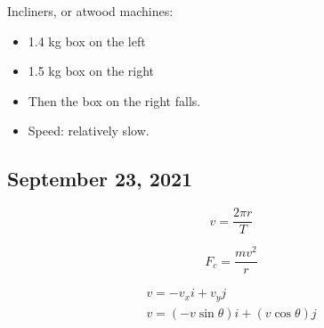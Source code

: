 \documentclass{scrreprt} %
\begin{document}
Incliners, or atwood machines:

\begin{itemize}
	\item 1.4 kg box on the left
	\item 1.5 kg box on the right
	\item Then the box on the right falls.
	\item Speed: relatively slow.
\end{itemize}

\subsection{September 23, 2021}

\begin{theorem}
	$$v = \frac{2\pi r}{T}$$
\end{theorem}

\begin{theorem}

$$F_c = \frac{mv^2}{r}$$

\begin{align*}
	v = -v_xi + v_yj \\ 
	v = (-v\sin \theta)i + (v\cos \theta)j \\
\end{align*}
	
\end{theorem}
\end{document}
